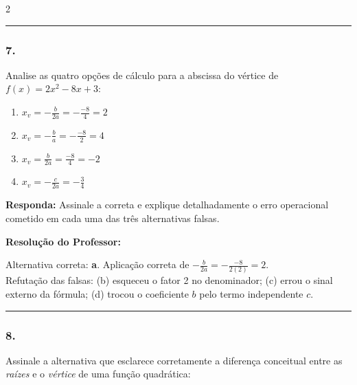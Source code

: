 \begin{multicols*}{2}
\par\vspace{\espacoQuestao}

\noindent\textcolor{CorLinha}{\rule{\linewidth}{0.5pt}} 
\par\vspace{\espacoPreQuestao}
\subsubsection*{7.} Analise as quatro opções de cálculo para a abscissa do vértice de $f(x) = 2x^2 - 8x + 3$:

\begin{enumerate}[label=\alph*), itemsep=\espacoAlt]
\item $x_v = -\frac{b}{2a} = -\frac{-8}{4} = 2$
\item $x_v = -\frac{b}{a} = -\frac{-8}{2} = 4$
\item $x_v = \frac{b}{2a} = \frac{-8}{4} = -2$
\item $x_v = -\frac{c}{2a} = -\frac{3}{4}$
\end{enumerate}

\begin{boxresponda}
\textbf{Responda:} Assinale a correta e explique detalhadamente o erro operacional cometido em cada uma das três alternativas falsas.
\end{boxresponda}

\ifgabarito
    \begin{tcolorbox}[colback=CorTitUm!5, colframe=CorTitUm, boxrule=1pt, arc=4pt, left=6pt, right=6pt, top=6pt, bottom=6pt]
    \small\textbf{\textcolor{CorTitUm}{Resolução do Professor:}}\par\vspace{0.1cm}
    \color{CinzaEscuro}
    Alternativa correta: \textbf{a}. Aplicação correta de $-\frac{b}{2a} = -\frac{-8}{2(2)} = 2$. \\
    Refutação das falsas: (b) esqueceu o fator 2 no denominador; (c) errou o sinal externo da fórmula; (d) trocou o coeficiente $b$ pelo termo independente $c$.
    \end{tcolorbox}
\fi

\par\vspace{\espacoQuestao}

\noindent\textcolor{CorLinha}{\rule{\linewidth}{0.5pt}} 
\par\vspace{\espacoPreQuestao}
\subsubsection*{8.} Assinale a alternativa que esclarece corretamente a diferença conceitual entre as \textit{raízes} e o \textit{vértice} de uma função quadrática:


\end{multicols*}
